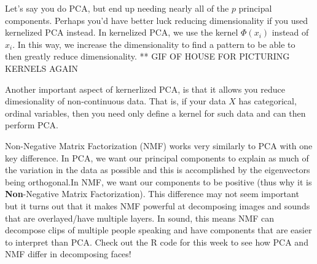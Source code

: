 \documentclass[a4paper]{article}
\begin{document}
Let's say you do PCA, but end up needing nearly all of the $p$ principal components. Perhaps you'd have better luck reducing dimensionality if you used kernelized PCA instead. In kernelized PCA, we use the kernel $\Phi(x_{i})$ instead of $x_{i}$. In this way, we increase the dimensionality to find a pattern to be able to then greatly reduce dimensionality.
** GIF OF HOUSE FOR PICTURING KERNELS AGAIN

Another important aspect of kernerlized PCA, is that it allows you reduce dimesionality of non-continuous data. That is, if your data $X$ has categorical, ordinal variables, then you need only define a kernel for such data and can then perform PCA.

Non-Negative Matrix Factorization (NMF) works very similarly to PCA with one key difference. In PCA, we want our principal components to explain as much of the variation in the data as possible and this is accomplished by the eigenvectors being orthogonal.In NMF, we want our components to be positive (thus why it is \textbf{Non}-Negative Matrix Factorization). This difference may not seem important but it turns out that it makes NMF powerful at decomposing images and sounds that are overlayed/have multiple layers. In sound, this means NMF can decompose clips of multiple people speaking and have components that are easier to interpret than PCA. Check out the R code for this week to see how PCA and NMF differ in decomposing faces!
\end{document}
